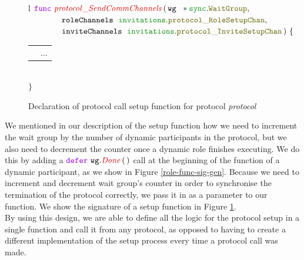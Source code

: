 \documentclass[12pt,twoside]{report}
\begin{document}
\begin{figure}[!h]
    \begin{center}
        \begin{tabular}{l}
            $\gofunc\ \functionname{protocol\_SendCommChannels} \, (\,\varname{wg}\ \;*\pkgstructaccess{sync}{WaitGroup},$\\
            
            $\qquad \qquad \varname{roleChannels}\ \;\pkgstructaccess{invitations}{protocol\_RoleSetupChan},$\\

            $\qquad \qquad \varname{inviteChannels}\ \;\pkgstructaccess{invitations}{protocol\_InviteSetupChan}\,)\ \{$\\[3pt]

            \begin{tabular}{ll}
                \indent & $\dots$\\[3.5pt]
            \end{tabular}\\[3pt]
            $\}$
        \end{tabular}
    \end{center}
    \caption{Declaration of protocol call setup function for protocol \textit{protocol}}
    \label{protocol-setup-func-gen}
\end{figure}

We mentioned in our description of the setup function how we need to increment the wait group by the number of dynamic participants in the protocol, but we also need to decrement the counter once a dynamic role finishes executing. We do this by adding a $\godefer\ \methodcall{wg}{Done}\,(\,)$ call at the beginning of the function of a dynamic participant, as we show in Figure \ref{role-func-sig-gen}. Because we need to increment and decrement wait group's counter in order to synchronise the termination of the protocol correctly, we pass it in as a parameter to our function. We show the signature of a setup function in Figure \ref{protocol-setup-func-gen}.\\

By using this design, we are able to define all the logic for the protocol setup in a single function and call it from any protocol, as opposed to having to create a different implementation of the setup process every time a protocol call was made.
\end{document}
